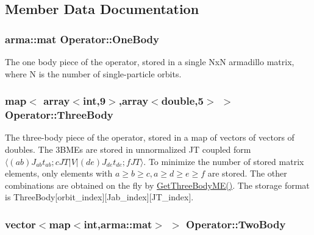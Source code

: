 \subsection{Member Data Documentation}
\hypertarget{classOperator_a14b1c78e0be45772aa57168c74d1b57c}{
\subsubsection[{One\-Body}]{\setlength{\rightskip}{0pt plus 5cm}arma\-::mat Operator\-::\-One\-Body}}\label{classOperator_a14b1c78e0be45772aa57168c74d1b57c}
The one body piece of the operator, stored in a single Nx\-N armadillo matrix, where N is the number of single-\/particle orbits. \hypertarget{classOperator_a5f5442cc5e6eb4f324283730145047f9}{
\subsubsection[{Three\-Body}]{\setlength{\rightskip}{0pt plus 5cm}map$<$ array$<$int,9$>$,array$<$double,5$>$ $>$ Operator\-::\-Three\-Body}}\label{classOperator_a5f5442cc5e6eb4f324283730145047f9}
The three-\/body piece of the operator, stored in a map of vectors of vectors of doubles. The 3\-B\-M\-Es are stored in unnormalized J\-T coupled form $ \langle (ab)J_{ab}t_{ab};cJT | V | (de)J_{de}t_{de};f JT \rangle $. To minimize the number of stored matrix elements, only elements with $ a\geq b \geq c, a\geq d\geq e \geq f $ are stored. The other combinations are obtained on the fly by \hyperlink{classOperator_ab2f0275c25ffb0f04935cb9d6ea043e1}{Get\-Three\-Body\-M\-E()}. The storage format is Three\-Body\mbox{[}orbit\-\_\-index\mbox{]}\mbox{[}Jab\-\_\-index\mbox{]}\mbox{[}J\-T\-\_\-index\mbox{]}. \hypertarget{classOperator_a0778ed6b9b7b47e34f11fa187189c943}{
\subsubsection[{Two\-Body}]{\setlength{\rightskip}{0pt plus 5cm}vector$<$map$<$int,arma\-::mat$>$ $>$ Operator\-::\-Two\-Body}}\label{classOperator_a0778ed6b9b7b47e34f11fa187189c943}
